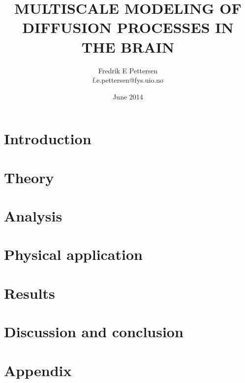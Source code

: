 \documentclass[twoside,english]{uiofysmaster}
\author{Fredrik E Pettersen\\ f.e.pettersen@fys.uio.no}
\title{\uppercase{Multiscale modeling of diffusion processes in the brain}}
\date{June 2014}
\begin{document}

\cleardoublepage





\tableofcontents
\clearpage
\listoffigures

\clearpage
\printnomenclature


\chapter{Introduction}
\clearpage


\chapter{Theory}
\clearpage


\chapter{Analysis}\label{chapter:analysis}
\clearpage


\chapter{Physical application}\label{chapter:application}
\clearpage


\chapter{Results}
\clearpage


\chapter{Discussion and conclusion}
\clearpage


\appendix
\chapter{Appendix}



\printbibliography
\end{document}
